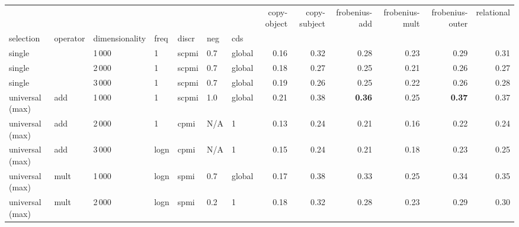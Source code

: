 \begin{tabular}{lllllllrrrrrr}
\toprule
       & {} &      &   &      &     &   &  copy-object &  copy-subject &  frobenius-add &  frobenius-mult &  frobenius-outer &  relational \\
selection & operator & dimensionality & freq & discr & neg & cds &              &               &                &                 &                  &             \\
\midrule
single                 & {}   & 1\,000 & 1    & scpmi & 0.7 & global &                 0.16  &                  0.32  &                   0.28  &                    0.23  &                     0.29  &                0.31  \\
single                 & {}   & 2\,000 & 1    & scpmi & 0.7 & global &                 0.18  &                  0.27  &                   0.25  &                    0.21  &                     0.26  &                0.27  \\
single                 & {}   & 3\,000 & 1    & scpmi & 0.7 & global &                 0.19  &                  0.26  &                   0.25  &                    0.22  &                     0.26  &                0.28  \\ \addlinespace
universal (max)        & add  & 1\,000 & 1    & scpmi & 1.0 & global &                 0.21  &                  0.38  &           \textbf{0.36} &                    0.25  &             \textbf{0.37} &                0.37  \\
universal (max)        & add  & 2\,000 & 1    & cpmi  & N/A & 1      &                 0.13  &                  0.24  &                   0.21  &                    0.16  &                     0.22  &                0.24  \\
universal (max)        & add  & 3\,000 & logn & cpmi  & N/A & 1      &                 0.15  &                  0.24  &                   0.21  &                    0.18  &                     0.23  &                0.25  \\ \addlinespace
universal (max)        & mult & 1\,000 & logn & spmi  & 0.7 & global &                 0.17  &                  0.38  &                   0.33  &                    0.25  &                     0.34  &                0.35  \\
universal (max)        & mult & 2\,000 & logn & spmi  & 0.2 & 1      &                 0.18  &                  0.32  &                   0.28  &                    0.23  &                     0.29  &                0.30  \\

\end{tabular}
